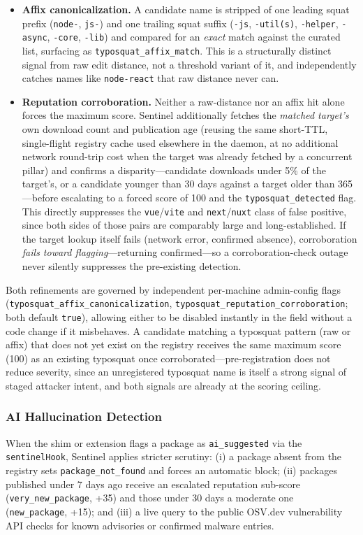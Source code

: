 \documentclass[journal]{IEEEtran}
\begin{document}
\begin{itemize}
\item \textbf{Affix canonicalization.} A candidate name is stripped of one leading squat prefix
(\texttt{node-}, \texttt{js-}) and one trailing squat suffix (\texttt{-js}, \texttt{-util(s)},
\texttt{-helper}, \texttt{-async}, \texttt{-core}, \texttt{-lib}) and compared for an \emph{exact} match
against the curated list, surfacing as \texttt{typosquat\_affix\_match}. This is a structurally distinct
signal from raw edit distance, not a threshold variant of it, and independently catches names like
\texttt{node-react} that raw distance never can.
\item \textbf{Reputation corroboration.} Neither a raw-distance nor an affix hit alone forces the maximum
score. Sentinel additionally fetches the \emph{matched target's} own download count and publication age
(reusing the same short-TTL, single-flight registry cache used elsewhere in the daemon, at no additional
network round-trip cost when the target was already fetched by a concurrent pillar) and confirms a
disparity---candidate downloads under 5\% of the target's, or a candidate younger than 30 days against a
target older than 365---before escalating to a forced score of 100 and the \texttt{typosquat\_detected}
flag. This directly suppresses the \texttt{vue}/\texttt{vite} and \texttt{next}/\texttt{nuxt} class of false
positive, since both sides of those pairs are comparably large and long-established. If the target lookup
itself fails (network error, confirmed absence), corroboration \emph{fails toward flagging}---returning
confirmed---so a corroboration-check outage never silently suppresses the pre-existing detection.
\end{itemize}

Both refinements are governed by independent per-machine admin-config flags
(\texttt{typosquat\_affix\_canonicalization}, \texttt{typosquat\_reputation\_corroboration}; both default
\texttt{true}), allowing either to be disabled instantly in the field without a code change if it misbehaves.
A candidate matching a typosquat pattern (raw or affix) that does not yet exist on the registry receives the
same maximum score (100) as an existing typosquat once corroborated---pre-registration does not reduce
severity, since an unregistered typosquat name is itself a strong signal of staged attacker intent, and both
signals are already at the scoring ceiling.

\subsubsection{AI Hallucination Detection}
When the shim or extension flags a package as \texttt{ai\_suggested} via the \texttt{sentinelHook}, Sentinel
applies stricter scrutiny: (i) a package absent from the registry sets \texttt{package\_not\_found} and
forces an automatic block; (ii) packages published under 7 days ago receive an escalated reputation
sub-score (\texttt{very\_new\_package}, +35) and those under 30 days a moderate one
(\texttt{new\_package}, +15); and (iii) a live query to the public OSV.dev vulnerability API checks for
known advisories or confirmed malware entries.
\end{document}
